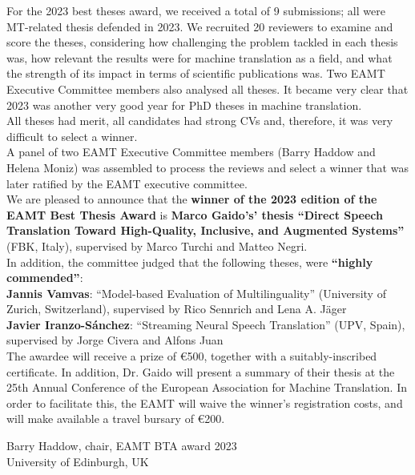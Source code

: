 For the 2023 best theses award, we received a total of 9 submissions; all were MT-related thesis defended in 2023.  We recruited 20 reviewers to examine and score the theses, considering how challenging the problem tackled in each thesis was, how relevant the results were for machine translation as a field, and what the strength of its impact in terms of scientific publications was. Two EAMT Executive Committee members also analysed all theses. It became very clear that 2023 was another very good year for PhD theses in machine translation. 
\\

All theses had merit, all candidates had strong CVs and, therefore, it was very difficult to select a winner.
\\

A panel of two EAMT Executive Committee members (Barry Haddow and Helena Moniz) was assembled to process the reviews and select a winner that was later ratified by the EAMT executive committee.
\\

We are pleased to announce that the {\bf winner of the 2023 edition of the EAMT Best Thesis Award} is {\bf Marco Gaido's' thesis ``Direct Speech Translation Toward High-Quality, Inclusive, and Augmented Systems''} (FBK, Italy), supervised by Marco Turchi and Matteo Negri.
\\

In addition, the committee judged  that the following theses, were {\bf ``highly commended''}:
\\
{\bf Jannis Vamvas}: “Model-based Evaluation of Multilinguality” (University of Zurich, Switzerland), supervised by Rico Sennrich and Lena A. Jäger
\\

{\bf Javier Iranzo-Sánchez}: ``Streaming Neural Speech Translation'' (UPV, Spain), supervised by Jorge Civera and Alfons Juan 
\\

The awardee will receive a prize of €500, together with a suitably-inscribed certificate. In addition, Dr. Gaido will present a summary of their thesis at the 25th Annual Conference of the European Association for Machine Translation.  In order to facilitate this, the EAMT will waive the winner's registration costs, and will make available a travel bursary of €200.


\bigbreak

Barry Haddow, chair, EAMT BTA award 2023 \\
University of Edinburgh, UK
